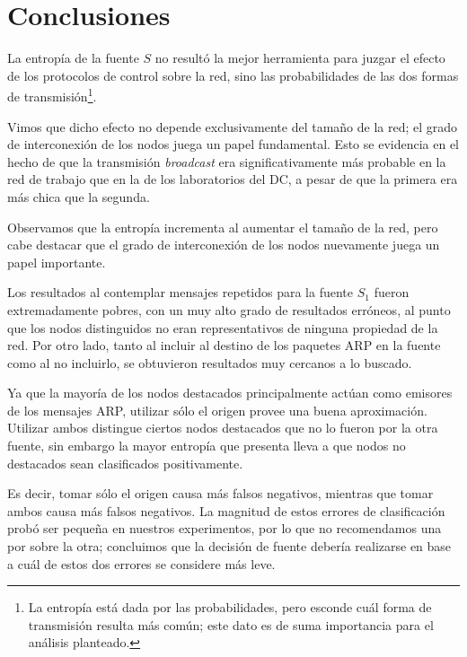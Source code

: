 \section{Conclusiones}

\par La entropía de la fuente $S$ no resultó la mejor herramienta para juzgar el efecto de los protocolos de control sobre la red, sino las probabilidades de las dos formas de transmisión\footnote{La entropía está dada por las probabilidades, pero esconde cuál forma de transmisión resulta más común; este dato es de suma importancia para el análisis planteado.}.

\par Vimos que dicho efecto no depende exclusivamente del tamaño de la red; el grado de interconexión de los nodos juega un papel fundamental.
Esto se evidencia en el hecho de que la transmisión \textit{broadcast} era significativamente más probable en la red de trabajo que en la de los laboratorios del DC, a pesar de que la primera era más chica que la segunda.

\par Observamos que la entropía incrementa al aumentar el tamaño de la red, pero cabe destacar que el grado de interconexión de los nodos nuevamente juega un papel importante.

\par Los resultados al contemplar mensajes repetidos para la fuente $S_1$ fueron extremadamente pobres, con un muy alto grado de resultados erróneos, al punto que los nodos distinguidos no eran representativos de ninguna propiedad de la red.
Por otro lado, tanto al incluir al destino de los paquetes ARP en la fuente como al no incluirlo, se obtuvieron resultados muy cercanos a lo buscado.

\par Ya que la mayoría de los nodos destacados principalmente actúan como emisores de los mensajes ARP, utilizar sólo el origen provee una buena aproximación.
Utilizar ambos distingue ciertos nodos destacados que no lo fueron por la otra fuente, sin embargo la mayor entropía que presenta lleva a que nodos no destacados sean clasificados positivamente.

\par Es decir, tomar sólo el origen causa más falsos negativos, mientras que tomar ambos causa más falsos negativos. 
La magnitud de estos errores de clasificación probó ser pequeña en nuestros experimentos, por lo que no recomendamos una por sobre la otra; concluimos que la decisión de fuente debería realizarse en base a cuál de estos dos errores se considere más leve. 

